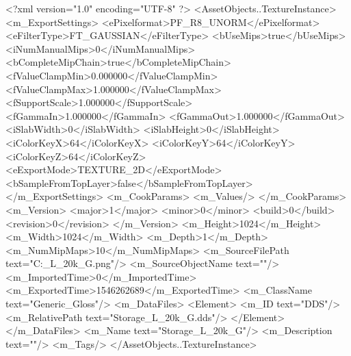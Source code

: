 <?xml version="1.0" encoding="UTF-8" ?>
<AssetObjects..TextureInstance>
	<m_ExportSettings>
		<ePixelformat>PF_R8_UNORM</ePixelformat>
		<eFilterType>FT_GAUSSIAN</eFilterType>
		<bUseMips>true</bUseMips>
		<iNumManualMips>0</iNumManualMips>
		<bCompleteMipChain>true</bCompleteMipChain>
		<fValueClampMin>0.000000</fValueClampMin>
		<fValueClampMax>1.000000</fValueClampMax>
		<fSupportScale>1.000000</fSupportScale>
		<fGammaIn>1.000000</fGammaIn>
		<fGammaOut>1.000000</fGammaOut>
		<iSlabWidth>0</iSlabWidth>
		<iSlabHeight>0</iSlabHeight>
		<iColorKeyX>64</iColorKeyX>
		<iColorKeyY>64</iColorKeyY>
		<iColorKeyZ>64</iColorKeyZ>
		<eExportMode>TEXTURE_2D</eExportMode>
		<bSampleFromTopLayer>false</bSampleFromTopLayer>
	</m_ExportSettings>
	<m_CookParams>
		<m_Values/>
	</m_CookParams>
	<m_Version>
		<major>1</major>
		<minor>0</minor>
		<build>0</build>
		<revision>0</revision>
	</m_Version>
	<m_Height>1024</m_Height>
	<m_Width>1024</m_Width>
	<m_Depth>1</m_Depth>
	<m_NumMipMaps>10</m_NumMipMaps>
	<m_SourceFilePath text="C:\Users\Shadow\Desktop\Prototypes\Storage_L_20k_G.png"/>
	<m_SourceObjectName text=""/>
	<m_ImportedTime>0</m_ImportedTime>
	<m_ExportedTime>1546262689</m_ExportedTime>
	<m_ClassName text="Generic_Gloss"/>
	<m_DataFiles>
		<Element>
			<m_ID text="DDS"/>
			<m_RelativePath text="Storage_L_20k_G.dds"/>
		</Element>
	</m_DataFiles>
	<m_Name text="Storage_L_20k_G"/>
	<m_Description text=""/>
	<m_Tags/>
</AssetObjects..TextureInstance>

